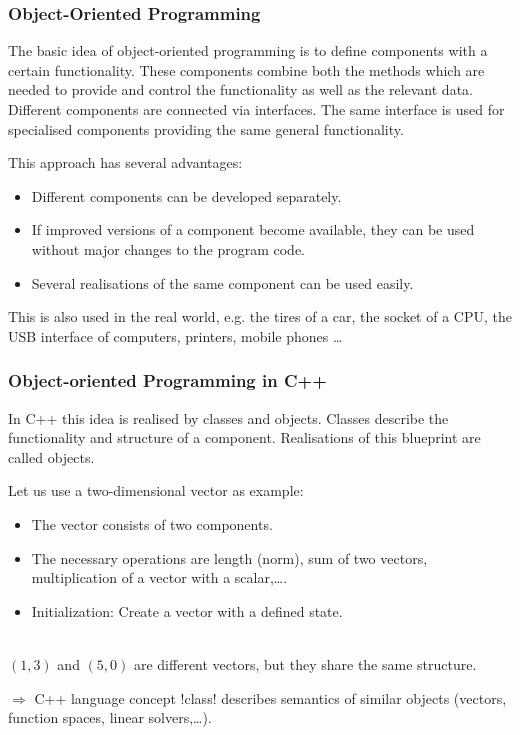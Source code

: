 \begin{frame}
\frametitle<presentation>{Object-Oriented Programming}
The basic idea of object-oriented programming is to define components with a certain functionality. These components combine both the methods which are needed to provide and control the functionality as well as the relevant data. Different components are connected via interfaces. The same interface is used for specialised components providing the same general functionality.

This approach has several advantages:
\begin{itemize}
\item Different components can be developed separately.
\item If improved versions of a component become available, they can be used without major changes to the program code.
\item Several realisations of the same component can be used easily.
\end{itemize}

This is also used in the real world, e.g. the tires of a car, the socket of a CPU, the USB interface of computers, printers, mobile phones \dots
\end{frame}

\begin{frame}
\frametitle{Object-oriented Programming in C++}
In C++ this idea is realised by classes and objects. Classes describe the functionality and structure of a component. Realisations of this blueprint are called objects. 

Let us use a two-dimensional vector as example:
\begin{itemize}
\item The vector consists of two components.
\item The necessary operations are length (norm), sum of two vectors, multiplication of a vector with a scalar,\dots.
\item Initialization: Create a vector with a defined state.
\end{itemize}\ \\
$(1,3)$ and $(5,0)$ are different vectors, but they share the same structure.\\
\pause
\begin{block}{$\Rightarrow$ C++ language concept}
\inline!class! describes semantics of similar objects (vectors, function spaces, linear solvers,\dots).
\end{block}
\end{frame}

